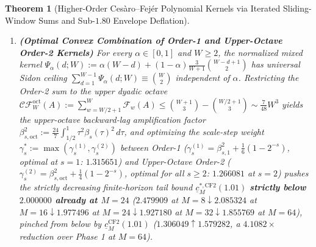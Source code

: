 \documentclass[11pt,reqno]{amsart}
\newtheorem{theorem}{Theorem}[section]
\theoremstyle{definition}
\theoremstyle{remark}
\begin{document}
\begin{theorem}[Higher-Order Ces\`aro--Fej\'er Polynomial Kernels via Iterated Sliding-Window Sums and Sub-$1.80$ Envelope Deflation]
\begin{enumerate}
  \begin{equation}\label{eq:c_infty_cf2}
    c_\infty^{*,\mathrm{CF2}}(1^+) \;=\; 2\sqrt{\frac{4}{5}} \;=\; \frac{4\sqrt{5}}{5} \;\approx\; 1.78885438 \;<\; 1.800000.
  \end{equation}
  \item[\textup{(b)}] \textbf{(Optimal Convex Combination of Order-1 and Upper-Octave Order-2 Kernels)} For every $\alpha \in [0, 1]$ and $W \ge 2$, the normalized mixed kernel $\Psi_\alpha(d; W) := \alpha(W - d) + (1 - \alpha)\frac{3}{W + 1}\binom{W - d + 1}{2}$ has universal Sidon ceiling $\sum_{d=1}^{W-1} \Psi_\alpha(d; W) \equiv \binom{W}{2}$ independent of $\alpha$. Restricting the Order-2 sum to the upper dyadic octave $\mathcal{CF}_W^{\mathrm{oct}}(A) := \sum_{w=W/2+1}^W \mathcal{F}_w(A) \le \binom{W+1}{3} - \binom{W/2+1}{3} \sim \frac{7}{48}W^3$ yields the upper-octave backward-lag amplification factor $\beta_{s,\mathrm{oct}}^2 := \frac{24}{7}\int_{1/2}^1 \tau^2 \beta_s(\tau)^2\,d\tau$, and optimizing the scale-step weight $\gamma_s^* := \max(\gamma_s^{(1)}, \gamma_s^{(2)})$ between Order-1 ($\gamma_s^{(1)} = \beta_{s,1}^2 + \frac{1}{6}(1 - 2^{-s})$, optimal at $s = 1$: $1.315651$) and Upper-Octave Order-2 ($\gamma_s^{(2)} = \beta_{s,\mathrm{oct}}^2 + \frac{1}{4}(1 - 2^{-s})$, optimal for all $s \ge 2$: $1.266081$ at $s=2$) pushes the strictly decreasing finite-horizon tail bound $\underline{c}_M^{*,\mathrm{CF2}}(1.01)$ \textbf{strictly below $2.000000$ already at $M = 24$} ($2.479909$ at $M=8 \downarrow 2.085324$ at $M=16 \downarrow 1.977496$ at $M=24 \downarrow 1.927180$ at $M=32 \downarrow 1.855769$ at $M=64$), pinched from below by $\underline{c}_M^{\mathrm{CF2}}(1.01)$ ($1.306049 \uparrow 1.579282$, a $4.1082\times$ reduction over Phase 1 at $M=64$).
\end{enumerate}
\end{theorem}
\end{document}
